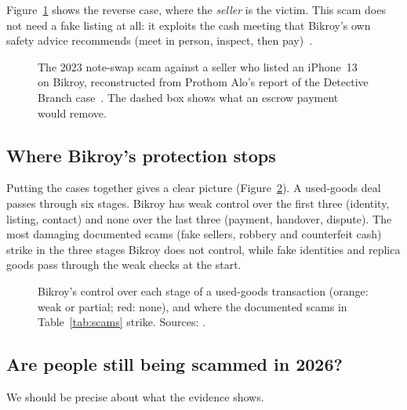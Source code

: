 Figure~\ref{fig:noteswap} shows the reverse case, where the \emph{seller} is the victim.
This scam does not need a fake listing at all: it exploits the cash meeting that Bikroy's
own safety advice recommends (meet in person, inspect, then pay)~\cite{bikroy_safety}.

\begin{figure}[H]
  \centering
  \resizebox{0.97\textwidth}{!}{}
  \caption{The 2023 note-swap scam against a seller who listed an iPhone~13 on Bikroy,
  reconstructed from Prothom Alo's report of the Detective Branch case~\cite{pa_2023}. The
  dashed box shows what an escrow payment would remove.}
  \label{fig:noteswap}
\end{figure}

\subsection{Where Bikroy's protection stops}

Putting the cases together gives a clear picture (Figure~\ref{fig:lifecycle}). A used-goods
deal passes through six stages. Bikroy has weak control over the first three (identity,
listing, contact) and none over the last three (payment, handover, dispute). The most
damaging documented scams (fake sellers, robbery and counterfeit cash) strike in the three
stages Bikroy does not control, while fake identities and replica goods pass through the weak
checks at the start.

\begin{figure}[H]
  \centering
  \resizebox{\textwidth}{!}{}
  \caption{Bikroy's control over each stage of a used-goods transaction (orange: weak or
  partial; red: none), and where the documented scams in Table~\ref{tab:scams} strike.
  Sources: \cite{fs_fraud,ds_jiji,bikroy_terms,bikroy_safety,ds_muktagacha,dt_2014,pa_2023}.}
  \label{fig:lifecycle}
\end{figure}

\subsection{Are people still being scammed in 2026?}
\label{sec:still}

We should be precise about what the evidence shows.

